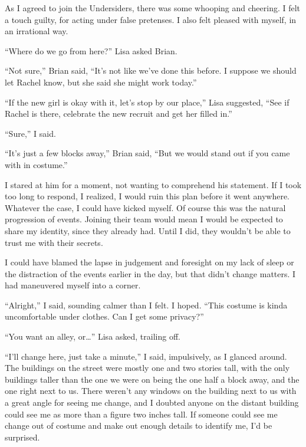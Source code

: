 





As I agreed to join the Undersiders, there was some whooping and cheering.  I felt a touch guilty, for acting under false pretenses.   I also felt pleased with myself, in an irrational way.



``Where do we go from here?'' Lisa asked Brian.



``Not sure,'' Brian said, ``It's not like we've done this before.  I suppose we should let Rachel know, but she said she might work today.''



``If the new girl is okay with it, let's stop by our place,'' Lisa suggested, ``See if Rachel is there, celebrate the new recruit and get her filled in.''



``Sure,'' I said.



``It's just a few blocks away,'' Brian said, ``But we would stand out if you came with in costume.''



I stared at him for a moment, not wanting to comprehend his statement.  If I took too long to respond, I realized, I would ruin this plan before it went anywhere.  Whatever the case, I could have kicked myself.  Of course this was the natural progression of events.  Joining their team would mean I would be expected to share my identity, since they already had.  Until I did, they wouldn't be able to trust me with their secrets.



I could have blamed the lapse in judgement and foresight on my lack of sleep or the distraction of the events earlier in the day, but that didn't change matters.  I had maneuvered myself into a corner.



``Alright,'' I said, sounding calmer than I felt.  I hoped.  ``This costume is kinda uncomfortable under clothes.  Can I get some privacy?''



``You want an alley, or\ldots'' Lisa asked, trailing off.



``I'll change here,  just take a minute,'' I said, impulsively, as I glanced around.  The buildings on the street were mostly one and two stories tall, with the only buildings taller than the one we were on being the one half a block away, and the one right next to us. There weren't any windows on the building next to us with a great angle for seeing me change, and I doubted anyone on the distant building could see me as more than a figure two inches tall.  If someone could see me change out of costume and make out enough details to identify me, I'd be surprised.



